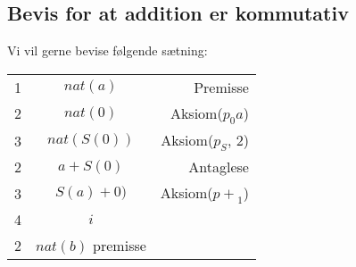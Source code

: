 \subsection*{Bevis for at addition er kommutativ}
Vi vil gerne bevise følgende sætning:

\begin{prooftree}
\end{prooftree}

\begin{tabular}{l c r}
    1 & $nat(a)$ & Premisse \\
    2 & $nat(0)$ & Aksiom($p_0a$) \\
    3 & $nat(S(0))$ & Aksiom($p_S$, 2) \\
    2 & $a + S(0)$ & Antaglese \\
    3 & $S(a) + 0)$ & Aksiom(${p+}_1$) \\
    4 & $i$ &  \\
    2 & $nat(b)$ premisse \\
\end{tabular}
